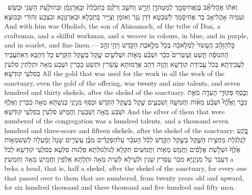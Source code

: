 {וְאִתּ֗וֹ אׇהֳלִיאָ֞ב בֶּן\maqqaf אֲחִיסָמָ֛ךְ לְמַטֵּה\maqqaf דָ֖ן חָרָ֣שׁ וְחֹשֵׁ֑ב וְרֹקֵ֗ם בַּתְּכֵ֙לֶת֙ וּבָֽאַרְגָּמָ֔ן וּבְתוֹלַ֥עַת הַשָּׁנִ֖י וּבַשֵּֽׁשׁ׃ \setuma }
{וְעִמֵּיהּ אָהֳלִיאָב בַּר אֲחִיסָמָךְ לְשִׁבְטָא דְּדָן נַגָּר וְאוּמָּן וְצַיָּיר בְּתַכְלָא וּבְאַרְגְּוָנָא וּבִצְבַע זְהוֹרִי וּבְבוּצָא׃}
{And with him was Oholiab, the son of Ahisamach, of the tribe of Dan, a craftsman, and a skilful workman, and a weaver in colours, in blue, and in purple, and in scarlet, and fine linen.—}{}
{כׇּל\maqqaf הַזָּהָ֗ב הֶֽעָשׂוּי֙ לַמְּלָאכָ֔ה בְּכֹ֖ל מְלֶ֣אכֶת הַקֹּ֑דֶשׁ וַיְהִ֣י \legarmeh  זְהַ֣ב הַתְּנוּפָ֗ה תֵּ֤שַׁע וְעֶשְׂרִים֙ כִּכָּ֔ר וּשְׁבַ֨ע מֵא֧וֹת וּשְׁלֹשִׁ֛ים שֶׁ֖קֶל בְּשֶׁ֥קֶל הַקֹּֽדֶשׁ׃}
{כָּל דַּהְבָּא דְּאִתְעֲבֵיד לַעֲבִידְתָא בְּכֹל עֲבִידַת קוּדְשָׁא וַהֲוָה דְּהַב אֲרָמוּתָא עֶשְׂרִין וּתְשַׁע כַּכְּרִין וּשְׁבַע מְאָה וּתְלָתִין סִלְעִין בְּסִלְעֵי קוּדְשָׁא׃}
{All the gold that was used for the work in all the work of the sanctuary, even the gold of the offering, was twenty and nine talents, and seven hundred and thirty shekels, after the shekel of the sanctuary.}{}
{וְכֶ֛סֶף פְּקוּדֵ֥י הָעֵדָ֖ה מְאַ֣ת כִּכָּ֑ר וְאֶ֩לֶף֩ וּשְׁבַ֨ע מֵא֜וֹת וַחֲמִשָּׁ֧ה וְשִׁבְעִ֛ים שֶׁ֖קֶל בְּשֶׁ֥קֶל הַקֹּֽדֶשׁ׃}
{וּכְסַף מִנְיָנֵי כְּנִשְׁתָּא מְאָה כַּכְּרִין וְאֶלֶף וּשְׁבַע מְאָה וְשִׁבְעִין וַחֲמֵישׁ סִלְעִין בְּסִלְעֵי קוּדְשָׁא׃}
{And the silver of them that were numbered of the congregation was a hundred talents, and a thousand seven hundred and three-score and fifteen shekels, after the shekel of the sanctuary:}{}
{בֶּ֚קַע לַגֻּלְגֹּ֔לֶת מַחֲצִ֥ית הַשֶּׁ֖קֶל בְּשֶׁ֣קֶל הַקֹּ֑דֶשׁ לְכֹ֨ל הָעֹבֵ֜ר עַל\maqqaf הַפְּקֻדִ֗ים מִבֶּ֨ן עֶשְׂרִ֤ים שָׁנָה֙ וָמַ֔עְלָה לְשֵׁשׁ\maqqaf מֵא֥וֹת אֶ֙לֶף֙ וּשְׁלֹ֣שֶׁת אֲלָפִ֔ים וַחֲמֵ֥שׁ מֵא֖וֹת וַחֲמִשִּֽׁים׃}
{תִּקְלָא לְגוּלְגּוּלְתָּא פַּלְגוּת סִלְעָא בְּסִלְעֵי קוּדְשָׁא לְכֹל דְּעָבַר עַל מִנְיָנַיָּא מִבַּר עַסְרִין שְׁנִין וּלְעֵילָא לְשֵׁית מְאָה וּתְלָתָא אַלְפִין וַחֲמֵישׁ מְאָה וְחַמְשִׁין׃}
{a beka a head, that is, half a shekel, after the shekel of the sanctuary, for every one that passed over to them that are numbered, from twenty years old and upward, for six hundred thousand and three thousand and five hundred and fifty men.}{}
